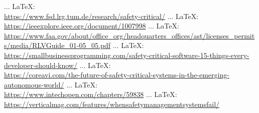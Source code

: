 \begin{thebibliography}{99}
{{{{{{{	 ... \LaTeX:\\ \url{https://www.fsd.lrg.tum.de/research/safety-critical/}
	 ... \LaTeX:\\ \url{https://ieeexplore.ieee.org/document/1007998}
	 ... \LaTeX:\\ \url{https://www.faa.gov/about/office_org/headquarters_offices/ast/licenses_permits/media/RLVGuide_01-05_05.pdf}
	 ... \LaTeX:\\ \url{https://smallbusinessprogramming.com/safety-critical-software-15-things-every-developer-should-know/}
	 ... \LaTeX:\\ \url{https://coreavi.com/the-future-of-safety-critical-systems-in-the-emerging-autonomous-world/}
	 ... \LaTeX:\\ \url{https://www.intechopen.com/chapters/59838}
	 ... \LaTeX:\\ \url{https://verticalmag.com/features/whensafetymanagementsystemsfail/}
	
}}}}}}}
\end{thebibliography}
